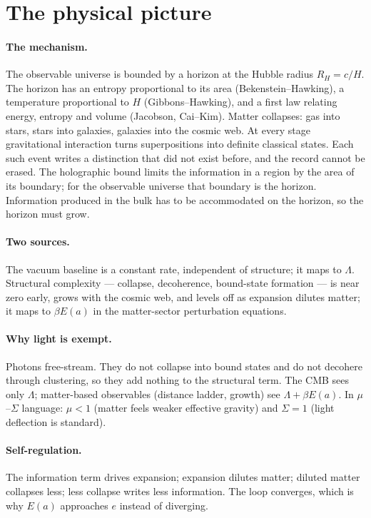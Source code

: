 \section{The physical picture}
\paragraph{The mechanism.} The observable universe is bounded by a horizon at the Hubble radius $R_H=c/H$. The horizon has an entropy proportional to
its area (Bekenstein--Hawking), a temperature proportional to $H$ (Gibbons--Hawking), and a first law relating energy, entropy and volume (Jacobson,
Cai--Kim). Matter collapses: gas into stars, stars into galaxies, galaxies into the cosmic web. At every stage gravitational interaction turns
superpositions into definite classical states. Each such event writes a distinction that did not exist before, and the record cannot be erased.
The holographic bound limits the information in a region by the area of its boundary; for the observable universe that boundary is the horizon.
Information produced in the bulk has to be accommodated on the horizon, so the horizon must grow.

\paragraph{Two sources.} The vacuum baseline is a constant rate, independent of structure; it maps to $\Lambda$. Structural complexity
--- collapse, decoherence, bound-state formation --- is near zero early, grows with the cosmic web, and levels off as expansion dilutes matter; it maps to
$\beta E(a)$ in the matter-sector perturbation equations.

\paragraph{Why light is exempt.} Photons free-stream. They do not collapse into bound states and do not decohere through clustering, so they add nothing
to the structural term. The CMB sees only $\Lambda$; matter-based observables (distance ladder, growth) see $\Lambda+\beta E(a)$. In $\mu$--$\Sigma$
language: $\mu<1$ (matter feels weaker effective gravity) and $\Sigma=1$ (light deflection is standard).

\paragraph{Self-regulation.} The information term drives expansion; expansion dilutes matter; diluted matter collapses less; less collapse writes less
information. The loop converges, which is why $E(a)$ approaches $e$ instead of diverging.

